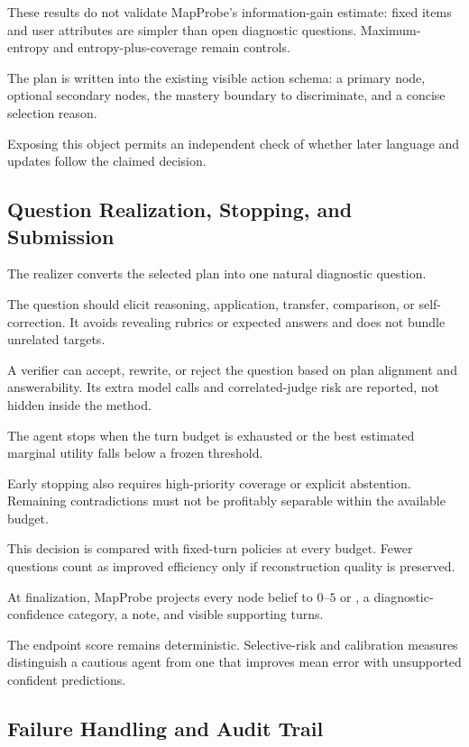 These results do not validate MapProbe's information-gain estimate: fixed items and user attributes are
simpler than open diagnostic questions. Maximum-entropy and entropy-plus-coverage remain controls.

The plan is written into the existing visible action schema: a primary node, optional secondary nodes,
the mastery boundary to discriminate, and a concise selection reason.

Exposing this object permits an independent check of whether later language and updates follow the
claimed decision.

\subsection{Question Realization, Stopping, and Submission}

The realizer converts the selected plan into one natural diagnostic question.

The question should elicit reasoning, application, transfer, comparison, or self-correction. It avoids
revealing rubrics or expected answers and does not bundle unrelated targets.

A verifier can accept, rewrite, or reject the question based on plan alignment and answerability. Its
extra model calls and correlated-judge risk are reported, not hidden inside the method.

The agent stops when the turn budget is exhausted or the best estimated marginal utility falls below a
frozen threshold.

Early stopping also requires high-priority coverage or explicit abstention. Remaining contradictions
must not be profitably separable within the available budget.

This decision is compared with fixed-turn policies at every budget. Fewer questions count as improved
efficiency only if reconstruction quality is preserved.

At finalization, MapProbe projects every node belief to $0$--$5$ or \unknown, a diagnostic-confidence
category, a note, and visible supporting turns.

The endpoint score remains deterministic. Selective-risk and calibration measures distinguish a
cautious agent from one that improves mean error with unsupported confident predictions.

\subsection{Failure Handling and Audit Trail}

